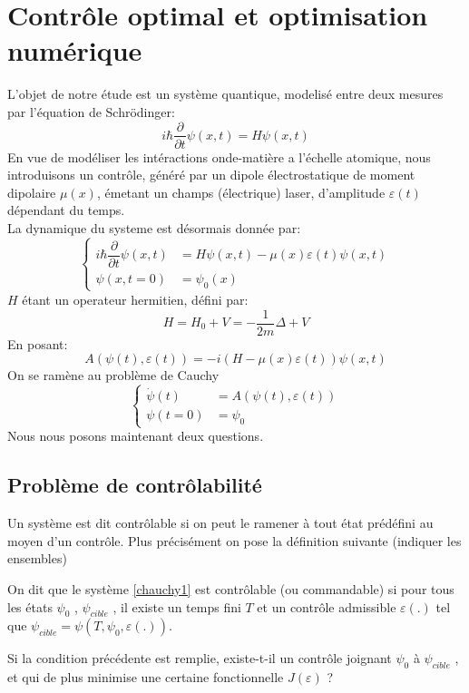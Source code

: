 \section*{Contrôle optimal et optimisation numérique}
L'objet de notre étude est un système quantique, modelisé entre deux mesures par l'équation de Schrödinger:
\begin{equation} \label{schrodinger}
i \hbar \dfrac{\partial }{\partial t} \psi (x,t) = H\psi (x,t)
\end{equation}
En vue de modéliser les intéractions onde-matière a l'échelle atomique, nous introduisons un contrôle, généré par un dipole électrostatique de moment dipolaire $\mu (x)$, émetant un champs (électrique) laser, d'amplitude $\varepsilon (t)$ dépendant du temps.\\
La dynamique du systeme est désormais donnée par:
\begin{equation} \label{eq1}
\begin{cases}
i \hbar \dfrac{\partial }{\partial t} \psi (x,t) &= H\psi (x,t)-\mu(x)\varepsilon(t)\psi (x,t) \\
\psi (x,t=0) &= \psi_0(x)
\end{cases}
\end{equation}
$H$ étant un operateur hermitien, défini par:
$$
H = H_0 + V = -\dfrac{1}{2m} \varDelta + V
$$
En posant:
\begin{equation}
A(\psi(t),\varepsilon(t))= -i(H-\mu(x)\varepsilon(t))\psi (x,t)
\end{equation}
On se ramène au problème de Cauchy
\begin{equation} \label{chauchy1}
\begin{cases}
\dot{\psi}(t) &= A(\psi(t),\varepsilon(t)) \\
\psi (t=0) &= \psi_0
\end{cases}
\end{equation}
Nous nous posons maintenant deux questions.
\subsection*{Problème de contrôlabilité}
Un système est dit contrôlable si on peut le ramener à tout état prédéfini au moyen d’un contrôle. Plus précisément on pose la définition suivante (indiquer les ensembles)
\begin{dfn}
On dit que le système \eqref{chauchy1} est contrôlable (ou commandable) si pour tous les états $\psi_0$ , $\psi_{cible}$ , il existe un temps fini $T$ et un contrôle admissible $\varepsilon(.)$ tel que $\psi_{cible} = \psi(T, \psi_0, \varepsilon(.))$.
\end{dfn}
Si la condition précédente est remplie, existe-t-il un contrôle joignant $\psi_0$ à $\psi_{cible}$ , et qui de plus
minimise une certaine fonctionnelle $J(\varepsilon)$ ?
